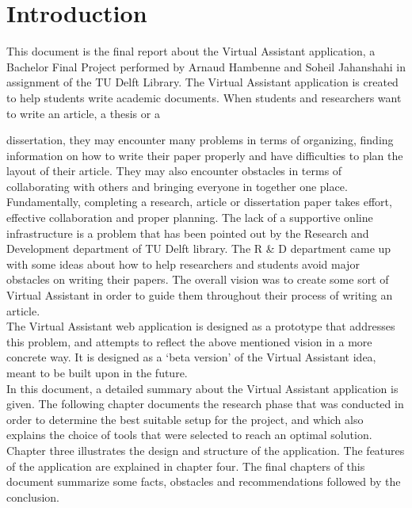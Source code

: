 \chapter{Introduction}

This document is the final report about the Virtual Assistant application, a Bachelor Final Project performed by Arnaud Hambenne and Soheil Jahanshahi in
assignment of the TU Delft Library. 
The Virtual Assistant application is created to help students write academic documents. When students and researchers want to write an article, a thesis or a 

dissertation, they may encounter many problems in terms of organizing, finding information on how to write their paper properly and have difficulties 
to plan the layout of their article. They may also encounter obstacles in terms of collaborating with others and bringing everyone in together one 
place. \\

Fundamentally, completing a research, article or dissertation paper takes effort, effective collaboration and proper planning. The lack of a supportive
online infrastructure is a problem that has been pointed out by the Research and Development department of TU Delft library. The R \& D department came 
up with some ideas about how to help researchers and students avoid major obstacles on writing their papers. The overall vision was to create some sort 
of Virtual Assistant in order to guide them throughout their process of writing an article.\\

The Virtual Assistant web application is designed as a prototype that addresses this problem, and attempts to reflect the above mentioned vision in a more 
concrete way. It is designed as a `beta version' of the Virtual Assistant idea, meant to be built upon in the future.\\ 

In this document, a detailed summary about the Virtual Assistant application is given. The following chapter documents the research phase that was conducted in 
order to determine the best suitable setup for the project, and which also explains the choice of tools that were selected to reach an optimal solution. 
Chapter three illustrates the design and structure of the application. The features of the application are explained in chapter four. The final chapters 
of this document summarize some facts, obstacles and recommendations followed by the conclusion.  